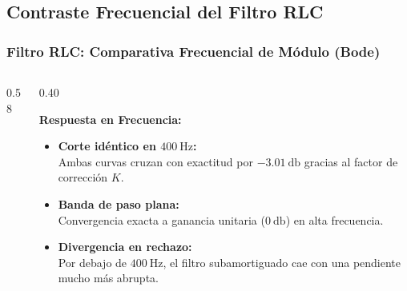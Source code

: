 \subsection{Contraste Frecuencial del Filtro RLC}
\begin{frame}
  \frametitle{Filtro RLC: Comparativa Frecuencial de Módulo (Bode)}

  \begin{columns}[c, onlytextwidth]
    \begin{column}{0.58\textwidth}
      \centering
    \end{column}

    \begin{column}{0.40\textwidth}
      \begin{tarjeta}
        {\fontsize{8.5pt}{10pt}\selectfont \textbf{\color{NavyDark} Respuesta en Frecuencia:}}\\[2pt]
        {\fontsize{7.2pt}{8.8pt}\selectfont
        \begin{itemize}\setlength{\itemsep}{3pt}
          \item \textbf{Corte idéntico en $\qty{400}{\hertz}$:}\\
          Ambas curvas cruzan con exactitud por $\qty{-3.01}{\decibel}$ gracias al factor de corrección $K$.
          \item \textbf{Banda de paso plana:}\\
          Convergencia exacta a ganancia unitaria ($\qty{0}{\decibel}$) en alta frecuencia.
          \item \textbf{Divergencia en rechazo:}\\
          Por debajo de $\qty{400}{\hertz}$, el filtro subamortiguado cae con una pendiente mucho más abrupta.
        \end{itemize}
        }
      \end{tarjeta}
    \end{column}
  \end{columns}
\end{frame}

